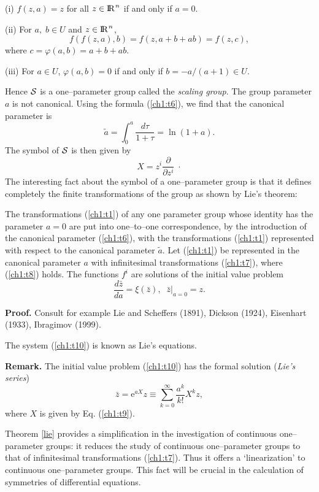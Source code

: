 (i) $f(z,a)=z$ for all $z\in \mathrm{I\!R\!}^{\;n}$ if and only if $a=0$.

(ii) For $a,\; b\in U$ and $z\in \mathrm{I\!R\!}^{\;n}$,
\[f(f(z,a),b)=f(z,a+b+ab)=f(z,c),\]
where $c=\varphi (a,b)=a+b+ab$.

(iii) For $a\in U$, $\varphi (a,b)=0$ if and only if $b=-a/(a+1) \in U$.

Hence $\cal{S}$ is a one--parameter group called the {\em scaling group}.
The group parameter $a$ is not canonical.
Using the formula (\ref{ch1:t6}), we find that the canonical parameter is
\[\tilde a=\int^{a}_{0} \frac{d\tau}{1+\tau}=\ln (1+a).\]
The  symbol of $\cal{S}$ is then given by
\[X=z^i\frac{\partial}{\partial z^i}\;\cdot \]
The interesting fact about the symbol of a one--parameter group  is that
it defines completely the finite transformations of the group as shown
by Lie's theorem:
\begin{theo}
\label{lie}
\begin{em}
The transformations (\ref{ch1:t1}) of any one parameter group whose
identity has the parameter $a=0$ are put into one--to--one correspondence,
by the introduction of the canonical parameter (\ref{ch1:t6}), with the
transformations (\ref{ch1:t1}) represented with respect to the canonical
parameter $\tilde a$. Let (\ref{ch1:t1}) be represented in the canonical
parameter $a$ with infinitesimal transformations (\ref{ch1:t7}), where
(\ref{ch1:t8}) holds.
The functions $f^i$ are solutions of the
initial value problem
\begin{equation}
\label{ch1:t10}
\frac{d\bar z}{da}=\xi (\bar z),\;\; \bar z|_{a=0}=z.
\end{equation}
\end{em}
\end{theo}
{\bf Proof.} Consult for example  Lie and Scheffers (1891), Dickson (1924),
Eisenhart (1933), Ibragimov (1999).

The system (\ref{ch1:t10}) is known as Lie's equations. 

{\bf Remark.} The initial value problem (\ref{ch1:t10}) has the formal
solution ({\em Lie's series})
\[\bar z=\mbox{e}^{a X}z\equiv \sum_{k=0}^{\infty}
\frac{a^k}{k!}X^k z,\]
where $X$ is given by Eq. (\ref{ch1:t9}). 

Theorem \ref{lie} provides a simplification in the investigation of
continuous
one--parameter groups: it reduces the study of continuous one--parameter
groups to that of infinitesimal transformations (\ref{ch1:t7}). Thus it offers a
`linearization' to  continuous one--parameter groups. This fact will
be crucial in the calculation of symmetries of differential equations.

